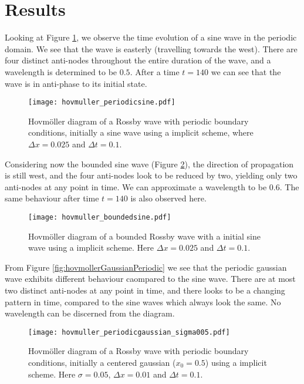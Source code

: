 \section{Results}
\label{sec:results}

Looking at Figure \ref{fig:hovmollerSinePeriodic}, we observe the time evolution of a sine wave in the periodic domain. We see that the wave is easterly (travelling towards the west). There are four distinct anti-nodes throughout the entire duration of the wave, and a wavelength is determined to be $0.5$. After a time $t=140$ we can see that the wave is in anti-phase to its initial state.
\begin{figure}[htbp]
	\centering
	\texttt{[image: hovmuller\_periodicsine.pdf]}
	\caption{Hovmöller diagram of a Rossby wave with periodic boundary conditions, initially a sine wave using a implicit scheme, where $\Delta x = 0.025$ and $\Delta t = 0.1$.}
	\label{fig:hovmollerSinePeriodic}
\end{figure}

Considering now the bounded sine wave (Figure \ref{fig:hovmollerSineBounded}), the direction of propagation is still west, and the four anti-nodes look to be reduced by two, yielding only two anti-nodes at any point in time. We can approximate a wavelength to be $0.6$. The same behaviour after time $t=140$ is also observed here.
\begin{figure}[htbp]
	\centering
	\texttt{[image: hovmuller\_boundedsine.pdf]}
	\caption{Hovmöller diagram of a bounded Rossby wave with a initial sine wave using a implicit scheme. Here $\Delta x = 0.025$ and $\Delta t = 0.1$.}
	\label{fig:hovmollerSineBounded}
\end{figure}

From Figure \ref{fig:hovmollerGaussianPeriodic} we see that the periodic gaussian wave exhibits different behaviour caompared to the sine wave. There are at most two distinct anti-nodes at any point in time, and there looks to be a changing pattern in time, compared to the sine waves which always look the same. No wavelength can be discerned from the diagram.
\begin{figure}[htbp]
	\centering
	\texttt{[image: hovmuller\_periodicgaussian\_sigma005.pdf]}
	\caption{Hovmöller diagram of a Rossby wave with periodic boundary conditions, initially a centered gaussian ($x_0=0.5$) using a implicit scheme. Here $\sigma = 0.05$, $\Delta x = 0.01$ and $\Delta t = 0.1$.}
	\label{fig:hovmollerGaussianPeriodic005}
\end{figure}

